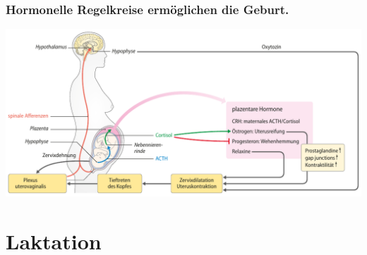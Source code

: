 \documentclass{beamer}
\begin{document}
\begin{frame}
\frametitle{Hormonelle Regelkreise ermöglichen die Geburt. }

\begin{center}
\includegraphics[width=\textwidth]{geburt_hormone}
\end{center}


\end{frame}






\section{Laktation}






\end{document}
